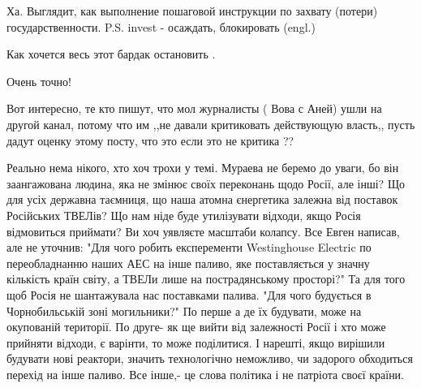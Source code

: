 \begin{itemize}
Ха. Выглядит, как выполнение пошаговой инструкции по захвату (потери) государственности.
P.S.
invest - осаждать, блокировать (engl.)

 
Как хочется весь этот бардак остановить .

 
Очень точно!

 

Вот интересно, те кто пишут, что мол журналисты ( Вова с Аней) ушли на другой
канал, потому что им ,,не давали критиковать действующую власть,, пусть дадут
оценку этому посту, что это если это не критика ??

 

Реально нема нікого, хто хоч трохи у темі. Мураева не беремо до уваги, бо він
заангажована людина, яка не змінює своїх переконань щодо Росії, але інші? Що
для усіх державна таємниця, що наша атомна єнергетика залежна від поставок
Російських ТВЕЛів? Що нам ніде буде утилізувати відходи, якщо Росія відмовиться
приймати? Ви хоч уявляєте масштаби колапсу. Все Евген написав, але не уточнив:
"Для чого робить експеременти Westinghouse Electric по переобладнанню наших АЕС
на інше паливо, яке поставляється у значну кількість країн світу, а ТВЕЛи лише
на пострадянському просторі?" Та для того щоб Росія не шантажувала нас
поставками палива. "Для чого будується в Чорнобильській зоні могильники?" По
перше а де їх будувати, може на окупованій території. По друге- як ще вийти від
залежності Росії і хто може прийняти відходи, є варінти, то може поділитися. І
нарешті, якщо вирішили будувати нові реактори, значить технологічно неможливо,
чи задорого обходиться перехід на інше паливо. Все інше,- це слова політика і
не патріота своєї країни.


\end{itemize}
